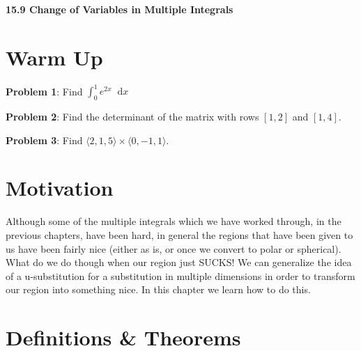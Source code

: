 \documentclass[11pt]{article}
\newcommand{\vs}{\vspace*{.1in}}
\newcommand*\dif{\mathop{}\!\mathrm{d}}
\begin{document}
\begin{LARGE}\begin{center}\bf 15.9 Change of Variables in Multiple Integrals\end{center}
\end{LARGE}

\vs\vs



\section{Warm Up}
\textbf{Problem 1}: Find $\int_0^1 e^{2x} \dif{x}$

\textbf{Problem 2}: Find the determinant of the matrix with rows $[1,2]$ and $[1,4]$.

\textbf{Problem 3}: Find $\langle 2,1,5\rangle \times \langle 0,-1, 1 \rangle$.


\section{Motivation}
Although some of the multiple integrals which we have worked through, in the previous chapters, have been hard, in general the regions that have been given to us have been fairly nice (either as is, or once we convert to polar or spherical). What do we do though when our region just SUCKS! We can generalize the idea of a u-substitution for a substitution in multiple dimensions in order to transform our region into something nice. In this chapter we learn how to do this.



\section{Definitions \& Theorems}
\end{document}
